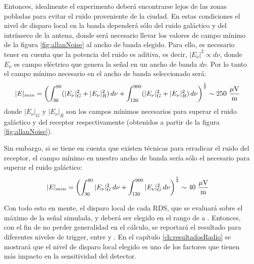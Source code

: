	Entonces, idealmente el experimento deber\'a encontrarse lejos de las zonas pobladas para evitar el ruido proveniente de la ciudad.
	En estas condiciones el nivel de disparo local en la banda  depender\'a s\'olo del ruido gal\'actico y del intr\'inseco de la antena, donde ser\'a necesario llevar los valores de campo m\'inimo de la figura \ref{fig:allanNoise} al ancho de banda elegido.
	Para ello, es necesario tener en cuenta que la potencia del ruido es aditiva, es decir, $|E_\nu|^2\propto d\nu$, donde $E_\nu$ es campo el\'ectrico que genera la se\~nal en un ancho de banda $d\nu$.
	Por lo tanto el campo m\'inimo necesario en el ancho de banda seleccionado ser\'a:
	\begin{equation}
	|E|_{min}=\left(\int_{30}^{80}(|E_\nu|^2_G+|E_\nu|^2_R)\,d\nu+
	\int_{120}^{900}(|E_\nu|^2_G+|E_\nu|^2_R)\,d\nu
	\right)^\frac{1}{2}
	\sim 250 {\rm\ \dfrac{\mu V}{m}}
	\end{equation}
	donde $|E_\nu|_G$ y $|E_\nu|_R$ son los campos m\'inimos necesarios para superar el ruido gal\'actico y del receptor respectivamente (obtenidos a partir de la figura \ref{fig:allanNoise}).
	
	Sin embargo, si se tiene en cuenta que existen t\'ecnicas para erradicar el ruido del receptor, el campo m\'inimo en nuestro ancho de banda ser\'ia s\'olo el necesario para superar el ruido gal\'actico:
	\begin{equation}
	|E|_{min}=\left(\int_{30}^{80}|E_\nu|^2_G \,d\nu+
	\int_{120}^{900}|E_\nu|^2_G\, d\nu
	\right)^\frac{1}{2}
	\sim 40 {\rm\ \dfrac{\mu V}{m}}
	\end{equation}
	
	Con todo esto en mente, el disparo local de cada RDS, que se evaluar\'a sobre el m\'aximo de la se\~nal simulada, y deber\'a ser elegido en el rango de  a .
	Entonces, con el fin de no perder generalidad en el c\'alculo, se reportar\'a el resultado para diferentes niveles de trigger, entre  y .
	En el cap\'itulo \ref{ch:resultadosRadio} se mostrar\'a que el nivel de disparo local elegido es uno de los factores que tienen m\'as impacto en la sensitividad del detector.
	

